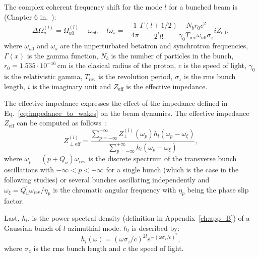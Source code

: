 The complex coherent frequency shift for the mode $l$ for a bunched beam is (Chapter 6 in.~\cite{Chao:collective}): %
\begin{equation}\label{eq:complext_tune_shift_modes_m}
    \Delta \Omega_u ^{(l)}= \Omega_{u0}^{(l)}-\omega_{u0}-l\omega_s = -\frac{1}{4\pi}\frac{\Gamma(l+1/2)}{2^l l!}\frac{N_b r_0 c^2}{\gamma_0 T_\mathrm{rev} \omega_{u0} \sigma_z} i Z_\mathrm{eff},
\end{equation}
where $\omega_{u0}$ and $\omega_s$ are the unperturbated betatron and synchrotron frequencies, $\Gamma(x)$ is the gamma function, $N_b$ is the number of particles in the bunch, $r_0=1.535 \cdot 10^{-16}$\,cm is the clasical radius of the proton, $c$ is the speed of light, $\gamma_0$ is the relativistic gamma, $T_\mathrm{rev}$ is the revolution period, $\sigma_z$ is the rms bunch length, $i$ is the imaginary unit and $Z_\mathrm{eff}$ is the effective impedance.

The effective impedance expresses the effect of the impedance defined in Eq.~\eqref{eq:impedance_to_wakes} on the beam dynamics. The effective impedance $Z_\mathrm{eff}$ can be computed as follows~\cite{Chao:collective}:
\begin{equation}\label{eq:effective_impedance}
    Z_{\perp \mathrm{eff}}^{(l)} = \frac{\sum_{p=-\infty}^{+ \infty}Z_{\perp }^{(l)}(\omega_{p}) h_l(\omega_{p}-\omega_\xi)}{\sum_{p=-\infty}^{+ \infty}h_l(\omega_{p}-\omega_\xi)},
\end{equation}
where $\omega_p = (p+Q_u)\omega_\mathrm{rev}$ is the discrete spectrum of the transverse bunch oscillations with $-\infty < p < + \infty$ for a single bunch (which is the case in the following studies) or several bunches oscillating independently and $\omega_\xi = Q_u^\prime \omega_\mathrm{rev} / \eta_p$ is the chromatic angular frequency with $\eta_p$ being the phase slip factor.

Last, $h_l$, is the power spectral density (definition in Appendix~\ref{ch:app_B}) of a Gaussian bunch of $l$ azimuthial mode. $h_l$ is described by: %
\begin{equation}\label{eq:spectral_density_of_gaussian_bunch}
    h_l(\omega) = (\omega \sigma_z/c)^{2l} e^{-(\omega \sigma_z/c)^2},
\end{equation}
where $\sigma_z$ is the rms bunch length and $c$ the speed of light.

